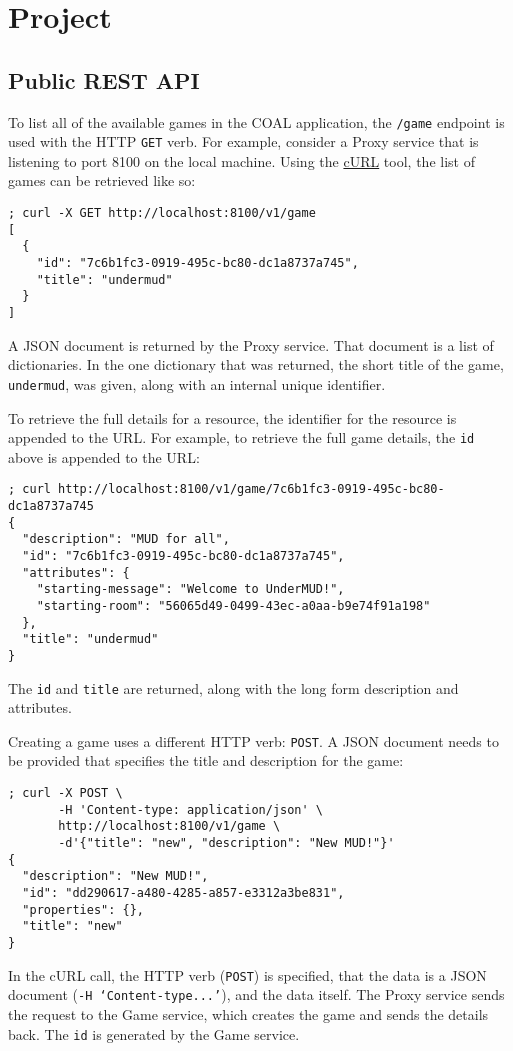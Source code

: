 \documentclass{article}
\newcommand{\enterProblemHeader}[1]{
}
\newcommand{\exitProblemHeader}[1]{
\nobreak\extramarks{#1}{}\nobreak
}
\newcounter{homeworkProblemCounter} %
\newcommand{\homeworkProblemName}{}
\newenvironment{homeworkProblem}[1][Problem \arabic{homeworkProblemCounter}]{ %
\stepcounter{homeworkProblemCounter} %
\renewcommand{\homeworkProblemName}{#1} %
\section{\homeworkProblemName} %
\enterProblemHeader{\homeworkProblemName} %
}{
\exitProblemHeader{\homeworkProblemName} %
}
\newcommand{\homeworkSectionName}{}
\newenvironment{homeworkSection}[1]{ %
\renewcommand{\homeworkSectionName}{#1} %
\subsection{\homeworkSectionName} %
\enterProblemHeader{\homeworkProblemName\ [\homeworkSectionName]} %
}{
\enterProblemHeader{\homeworkProblemName} %
}
\begin{document}
\begin{homeworkProblem}[Project]
\begin{homeworkSection}{Public REST API}
	To list all of the available games in the COAL application, the \texttt{/game} endpoint is used with the HTTP \texttt{GET} verb. For example, consider a Proxy service that is listening to port 8100 on the local machine. Using the \href{https://curl.se/}{cURL} tool, the list of games can be retrieved like so:

\begin{Verbatim}[fontsize=\small]
; curl -X GET http://localhost:8100/v1/game
[
  {
    "id": "7c6b1fc3-0919-495c-bc80-dc1a8737a745",
    "title": "undermud"
  }
]
\end{Verbatim}

	A JSON document is returned by the Proxy service. That document is a list of dictionaries. In the one dictionary that was returned, the short title of the game, \texttt{undermud}, was given, along with an internal unique identifier.

	To retrieve the full details for a resource, the identifier for the resource is appended to the URL. For example, to retrieve the full game details, the \texttt{id} above is appended to the URL:

\begin{Verbatim}[fontsize=\small]
; curl http://localhost:8100/v1/game/7c6b1fc3-0919-495c-bc80-dc1a8737a745
{
  "description": "MUD for all",
  "id": "7c6b1fc3-0919-495c-bc80-dc1a8737a745",
  "attributes": {
    "starting-message": "Welcome to UnderMUD!",
    "starting-room": "56065d49-0499-43ec-a0aa-b9e74f91a198"
  },
  "title": "undermud"
}
\end{Verbatim}	

	The \texttt{id} and \texttt{title} are returned, along with the long form description and attributes.

	Creating a game uses a different HTTP verb: \texttt{POST}. A JSON document needs to be provided that specifies the title and description for the game:

\begin{Verbatim}[fontsize=\small]
; curl -X POST \
       -H 'Content-type: application/json' \
       http://localhost:8100/v1/game \
       -d'{"title": "new", "description": "New MUD!"}'
{
  "description": "New MUD!",
  "id": "dd290617-a480-4285-a857-e3312a3be831",
  "properties": {},
  "title": "new"
}
\end{Verbatim}

	In the cURL call, the HTTP verb (\texttt{POST}) is specified, that the data is a JSON document (\texttt{-H `Content-type...'}), and the data itself. The Proxy service sends the request to the Game service, which creates the game and sends the details back. The \texttt{id} is generated by the Game service.


\end{homeworkSection}
\end{homeworkProblem}
\end{document}
